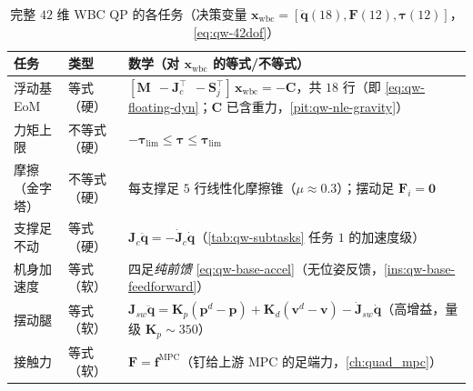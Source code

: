 \begin{table}[H]\centering\small
\caption{完整 $42$ 维 WBC QP 的各任务（决策变量 $\boldsymbol{x}_{\mathrm{wbc}}=[\ddot{\boldsymbol{q}}(18),\boldsymbol{F}(12),\boldsymbol{\tau}(12)]$，\cref{eq:qw-42dof}）}
\begin{tabular}{p{} p{} p{}}
\toprule
任务 & 类型 & 数学（对 $\boldsymbol{x}_{\mathrm{wbc}}$ 的等式/不等式） \\
\midrule
浮动基 EoM & 等式（硬）& $[\boldsymbol{M}\ \ -\boldsymbol{J}_c^\top\ \ -\boldsymbol{S}_j^\top]\,\boldsymbol{x}_{\mathrm{wbc}}=-\boldsymbol{C}$，共 $18$ 行（即 \cref{eq:qw-floating-dyn}；$\boldsymbol{C}$ 已含重力，\cref{pit:qw-nle-gravity}）\\
力矩上限 & 不等式（硬）& $-\boldsymbol{\tau}_{\lim}\le\boldsymbol{\tau}\le\boldsymbol{\tau}_{\lim}$ \\
摩擦（金字塔）& 不等式（硬）& 每支撑足 $5$ 行线性化摩擦锥（$\mu\!\approx\!0.3$）；摆动足 $\boldsymbol{F}_i=\mathbf{0}$ \\
支撑足不动 & 等式（硬）& $\boldsymbol{J}_c\ddot{\boldsymbol{q}}=-\dot{\boldsymbol{J}}_c\dot{\boldsymbol{q}}$（\cref{tab:qw-subtasks} 任务 $1$ 的加速度级）\\
机身加速度 & 等式（软）& 四足\emph{纯前馈} \cref{eq:qw-base-accel}（无位姿反馈，\cref{ins:qw-base-feedforward}）\\
摆动腿 & 等式（软）& $\boldsymbol{J}_{sw}\ddot{\boldsymbol{q}}=\boldsymbol{K}_p(\boldsymbol{p}^d-\boldsymbol{p})+\boldsymbol{K}_d(\boldsymbol{v}^d-\boldsymbol{v})-\dot{\boldsymbol{J}}_{sw}\dot{\boldsymbol{q}}$（高增益，量级 $\boldsymbol{K}_p\!\sim\!350$）\\
接触力 & 等式（软）& $\boldsymbol{F}=\boldsymbol{f}^{\mathrm{MPC}}$（钉给上游 MPC 的足端力，\cref{ch:quad_mpc}）\\
\bottomrule
\end{tabular}
\label{tab:qw-42tasks}
\end{table}

